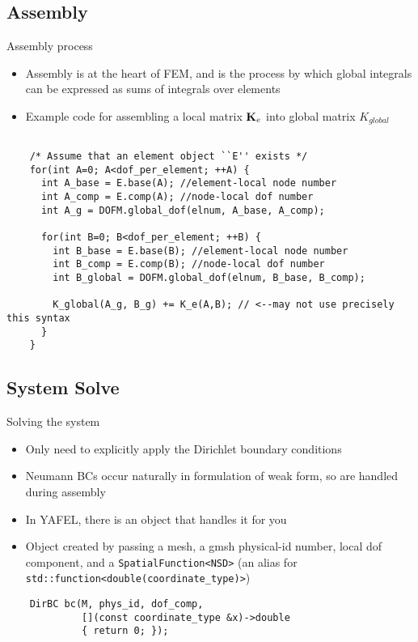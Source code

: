 \subsection{Assembly}
\begin{frame}[fragile]{Assembly process}
  \begin{itemize}
  \item
    Assembly is at the heart of FEM, and is the process by which
    global integrals can be expressed as sums of integrals over elements
  \item
    Example code for assembling a local matrix $\mathbf{K}_e$ into 
    global matrix $K_{global}$
  \end{itemize}
  \begin{lstlisting}[basicstyle=\tiny\ttfamily]

    /* Assume that an element object ``E'' exists */
    for(int A=0; A<dof_per_element; ++A) {
      int A_base = E.base(A); //element-local node number
      int A_comp = E.comp(A); //node-local dof number
      int A_g = DOFM.global_dof(elnum, A_base, A_comp);

      for(int B=0; B<dof_per_element; ++B) {
        int B_base = E.base(B); //element-local node number
        int B_comp = E.comp(B); //node-local dof number
        int B_global = DOFM.global_dof(elnum, B_base, B_comp);
        
        K_global(A_g, B_g) += K_e(A,B); // <--may not use precisely this syntax
      }
    }
  \end{lstlisting}
\end{frame}

\subsection{System Solve}
\begin{frame}[fragile]{Solving the system}
  \begin{itemize}
  \item
    Only need to explicitly apply the Dirichlet boundary conditions
  \item
    Neumann BCs occur naturally in formulation of weak form, so are
    handled during assembly
  \item
    In YAFEL, there is an object that handles it for you
  \item
    Object created by passing a mesh, a gmsh physical-id number, local dof component,
    and a \texttt{SpatialFunction<NSD>} 
    (an alias for \texttt{std::function<double(coordinate\_type)>})
  \end{itemize}
  \begin{lstlisting}
    DirBC bc(M, phys_id, dof_comp, 
             [](const coordinate_type &x)->double
             { return 0; });
  \end{lstlisting}
\end{frame}

